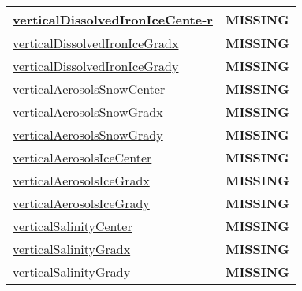 {\begin{center}
\begin{longtable}{| p{2.0in} | p{4.0in} |}
    \hline
    \hyperref[subsec:var_sec_tracer_reconstruction_verticalDissolvedIronIceCenter]{verticalDissolvedIronIceCente-}\hyperref[subsec:var_sec_tracer_reconstruction_verticalDissolvedIronIceCenter]{r  }& {\bf \color{red} MISSING} \\
    \hline
    \hyperref[subsec:var_sec_tracer_reconstruction_verticalDissolvedIronIceGradx]{verticalDissolvedIronIceGradx} & {\bf \color{red} MISSING} \\
    \hline
    \hyperref[subsec:var_sec_tracer_reconstruction_verticalDissolvedIronIceGrady]{verticalDissolvedIronIceGrady} & {\bf \color{red} MISSING} \\
    \hline
    \hyperref[subsec:var_sec_tracer_reconstruction_verticalAerosolsSnowCenter]{verticalAerosolsSnowCenter} & {\bf \color{red} MISSING} \\
    \hline
    \hyperref[subsec:var_sec_tracer_reconstruction_verticalAerosolsSnowGradx]{verticalAerosolsSnowGradx} & {\bf \color{red} MISSING} \\
    \hline
    \hyperref[subsec:var_sec_tracer_reconstruction_verticalAerosolsSnowGrady]{verticalAerosolsSnowGrady} & {\bf \color{red} MISSING} \\
    \hline
    \hyperref[subsec:var_sec_tracer_reconstruction_verticalAerosolsIceCenter]{verticalAerosolsIceCenter} & {\bf \color{red} MISSING} \\
    \hline
    \hyperref[subsec:var_sec_tracer_reconstruction_verticalAerosolsIceGradx]{verticalAerosolsIceGradx} & {\bf \color{red} MISSING} \\
    \hline
    \hyperref[subsec:var_sec_tracer_reconstruction_verticalAerosolsIceGrady]{verticalAerosolsIceGrady} & {\bf \color{red} MISSING} \\
    \hline
    \hyperref[subsec:var_sec_tracer_reconstruction_verticalSalinityCenter]{verticalSalinityCenter} & {\bf \color{red} MISSING} \\
    \hline
    \hyperref[subsec:var_sec_tracer_reconstruction_verticalSalinityGradx]{verticalSalinityGradx} & {\bf \color{red} MISSING} \\
    \hline
    \hyperref[subsec:var_sec_tracer_reconstruction_verticalSalinityGrady]{verticalSalinityGrady} & {\bf \color{red} MISSING} \\
    \hline
\end{longtable}
\end{center}
}
